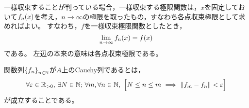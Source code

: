 \documentclass[b5paper,draft]{ltjsbook}
\begin{document}
\begin{rem}
    一様収束することが判っている場合，一様収束する極限関数は，$x$を固定しておいて$\fun{f_n}{x}$を考え，$n\to\infty$の極限を取ったもの，すなわち各点収束極限として求めればよい。
    すなわち，$f$を一様収束極限関数としたとき，
    \begin{equation}
        \limn\fun{f_n}{x}=\fun{f}{x}
    \end{equation}
    である。
    左辺の本来の意味は各点収束極限である。
\end{rem}


\begin{defi}[関数のCauchy列]
    関数列$\seq{f_n}{n\in\N}$が$A$上のCauchy列であるとは，
    \begin{equation}
        \forall\varepsilon\in\Rposi,\,\exists N\in\N;\, \forall m,\forall n\in\N,\ \bsqu{
            N\leq n\leq m\ \Longrightarrow\ \norm{f_m-f_n}<\varepsilon
        }
    \end{equation}
    が成立することである。
\end{defi}
\end{document}
